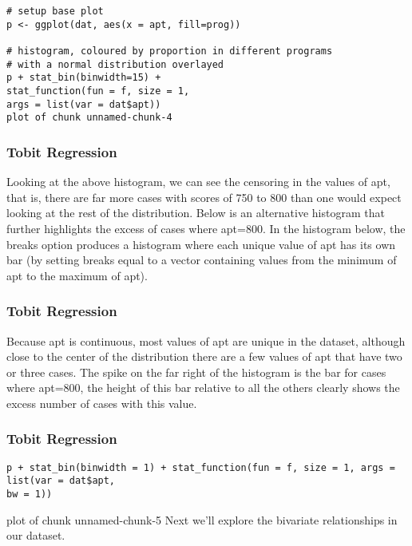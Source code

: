 \documentclass{beamer}
\begin{document}
\begin{frame}[fragile]
\begin{framed}
\begin{verbatim}	
# setup base plot
p <- ggplot(dat, aes(x = apt, fill=prog))

# histogram, coloured by proportion in different programs
# with a normal distribution overlayed
p + stat_bin(binwidth=15) +
stat_function(fun = f, size = 1,
args = list(var = dat$apt))
plot of chunk unnamed-chunk-4
\end{verbatim}
\end{framed}
\end{frame}
\begin{frame}[fragile]
\frametitle{Tobit Regression}
Looking at the above histogram, we can see the censoring in the values of apt, that is, there are far more cases with scores of 750 to 800 than one would expect looking at the rest of the distribution. Below is an alternative histogram that further highlights the excess of cases where apt=800. In the histogram below, the breaks option produces a histogram where each unique value of apt has its own bar (by setting breaks equal to a vector containing values from the minimum of apt to the maximum of apt). 

\end{frame}
\begin{frame}[fragile]
	\frametitle{Tobit Regression}
Because apt is continuous, most values of apt are unique in the dataset, although close to the center of the distribution there are a few values of apt that have two or three cases. The spike on the far right of the histogram is the bar for cases where apt=800, the height of this bar relative to all the others clearly shows the excess number of cases with this value.
\end{frame}
\begin{frame}[fragile]
	\frametitle{Tobit Regression}
\begin{verbatim}
p + stat_bin(binwidth = 1) + stat_function(fun = f, size = 1, args = list(var = dat$apt, 
bw = 1))
\end{verbatim}
plot of chunk unnamed-chunk-5
Next we'll explore the bivariate relationships in our dataset.
\end{frame}
\end{document}
